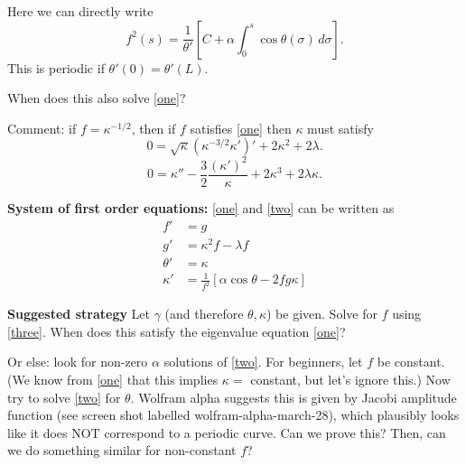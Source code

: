 \documentclass[12pt, a4paper]{amsart}
\theoremstyle{remark}
\begin{document}
Here we can directly write 
\begin{equation}f^2(s)=\frac1{\theta'}\left[C+ \alpha \int_0^s \cos\theta(\sigma)\,d\sigma\right].\label{three} \end{equation}
This is periodic if $\theta'(0)=\theta'(L)$.


When does this also solve \eqref{one}?



Comment:  if $f=\kappa^{-1/2}$, then if $f$ satisfies \eqref{one} then $\kappa$ must satisfy
$$0=\sqrt{\kappa}(\kappa^{-3/2}\kappa')'+ 2\kappa^2+ 2\lambda.$$
$$0=\kappa''-\frac32\frac{(\kappa')^2}\kappa+2\kappa^3+2\lambda\kappa.$$

\textbf{System of first order equations:} \eqref{one} and \eqref{two} can be written as 
\begin{align*}
f'&=g\\
g'&=\kappa^2f-\lambda f \\
\theta'&= \kappa \\
\kappa'&=\frac1{f^2}\left[\alpha \cos\theta-2 fg\kappa\right]
\end{align*}


\textbf{Suggested strategy} Let $\gamma$ (and therefore $\theta, \kappa$) be given.   Solve for $f$ using \eqref{three}.      When does this satisfy the eigenvalue equation \eqref{one}?

Or else:  look for non-zero $\alpha$ solutions of \eqref{two}.   For beginners, let $f$ be constant.   (We know from \eqref{one} that this implies $\kappa=$ constant, but let's ignore this.) Now try to solve \eqref{two} for $\theta$.      Wolfram alpha suggests this is given by Jacobi amplitude function (see screen shot labelled wolfram-alpha-march-28), which plausibly looks like it does NOT correspond to a periodic curve.      Can we prove this?   Then, can we do something similar for non-constant $f$?



 
\end{document}
